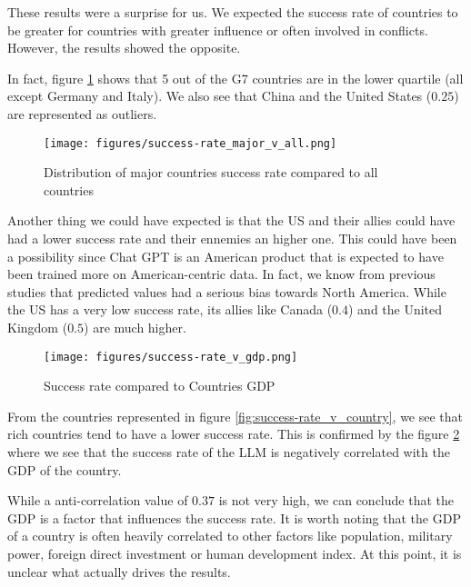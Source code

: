 These results were a surprise for us. We expected the success rate of countries to be greater for countries with greater influence or often involved in conflicts. However, the results showed the opposite.

In fact, figure \ref{fig:success-rate_major_v_all} shows that 5 out of the G7 countries are in the lower quartile (all except Germany and Italy). We also see that China and the United States ($0.25$) are represented as outliers.

\begin{figure}[H]
    \texttt{[image: figures/success-rate\_major\_v\_all.png]}
    \caption[Plot of the success rate distribution of major countries compared to the distribution of all countries]{Distribution of major countries success rate compared to all countries}
    \label{fig:success-rate_major_v_all}
\end{figure}

Another thing we could have expected is that the US and their allies could have had a lower success rate and their ennemies an higher one. This could have been a possibility since Chat GPT is an American product that is expected to have been trained more on American-centric data. In fact, we know from previous studies that predicted values had a serious bias towards North America\cite{li-etal-2022-herb}\cite{yu2023largelanguagemodelattributed}. While the US has a very low success rate, its allies like Canada ($0.4$) and the United Kingdom ($0.5$) are much higher.

\begin{figure}[H]
    \texttt{[image: figures/success-rate\_v\_gdp.png]}
    \caption[Plot of success rate of countries based on their GDP]{Success rate compared to Countries GDP \cite{worldbank:gdp}}
    \label{fig:success-rate_v_gdp}
\end{figure}

From the countries represented in figure \ref{fig:success-rate_v_country}, we see that rich countries tend to have a lower success rate. This is confirmed by the figure \ref{fig:success-rate_v_gdp} where we see that the success rate of the LLM is negatively correlated with the GDP of the country.

While a anti-correlation value of $0.37$ is not very high, we can conclude that the GDP is a factor that influences the success rate. It is worth noting that the GDP of a country is often heavily correlated to other factors like population, military power, foreign direct investment\cite{Dinu2015INFORMATICMU} or human development index\cite{Sajith2020ApplicabilityOH}. At this point, it is unclear what actually drives the results.

